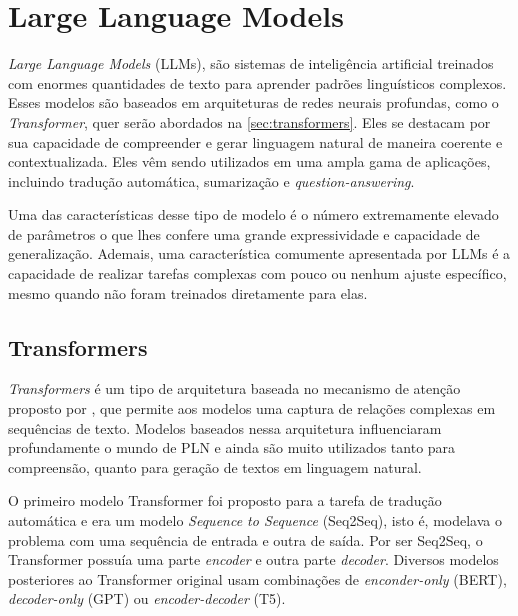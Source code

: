 \documentclass[cic,tc]{iiufrgs}
\begin{document}

\section{Large Language Models}
\label{sec:LLMs}
\textit{Large Language Models} (LLMs), são sistemas de inteligência artificial treinados com enormes quantidades de texto para aprender padrões linguísticos complexos. Esses modelos são baseados em arquiteturas de redes neurais profundas, como o \textit{Transformer}, quer serão abordados na \autoref{sec:transformers}. Eles se destacam por sua capacidade de compreender e gerar linguagem natural de maneira coerente e contextualizada. Eles vêm sendo utilizados em uma ampla gama de aplicações, incluindo tradução automática, sumarização e \textit{question-answering}.

Uma das características desse tipo de modelo é o número extremamente elevado de parâmetros o que lhes confere uma grande expressividade e capacidade de generalização. Ademais, uma característica comumente apresentada por LLMs é a capacidade de realizar tarefas complexas com pouco ou nenhum ajuste específico, mesmo quando não foram treinados diretamente para elas.

\subsection{Transformers}
\label{sec:transformers}
\textit{Transformers} é um tipo de arquitetura baseada no mecanismo de atenção proposto por \citet{vaswani2023attentionneed}, que permite aos modelos uma captura de relações complexas em sequências de texto. Modelos baseados nessa arquitetura influenciaram profundamente o mundo de PLN e ainda são muito utilizados tanto para compreensão, quanto para geração de textos em linguagem natural.

O primeiro modelo Transformer \cite{vaswani2023attentionneed} foi proposto para a tarefa de tradução automática e era um modelo \textit{Sequence to Sequence} (Seq2Seq), isto é, modelava o problema com uma sequência de entrada e outra de saída. Por ser Seq2Seq, o Transformer possuía uma parte \textit{encoder} e outra parte \textit{decoder}. Diversos modelos posteriores ao Transformer original usam combinações de \textit{enconder-only} (BERT), \textit{decoder-only} (GPT) ou \textit{encoder-decoder} (T5).
\end{document}

